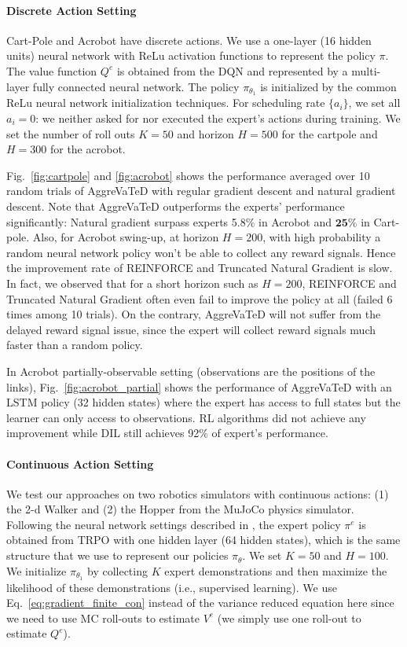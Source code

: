 \documentclass{article}
\begin{document}
\paragraph{Discrete Action Setting} Cart-Pole and Acrobot have discrete actions. We use a one-layer (16 hidden units) neural network with ReLu activation functions to represent the policy $\pi$. The value function $Q^e$ is obtained from the DQN \cite{mnih2015human} and represented by a multi-layer fully connected neural network. The policy $\pi_{\theta_1}$ is initialized by the common ReLu neural network initialization techniques. For scheduling rate $\{a_i\}$, we set all $a_i = 0$: we neither asked for nor executed the expert's actions during training. We set the number of roll outs $K = 50$ and horizon $H = 500$ for the cartpole and $H = 300$ for the acrobot.



Fig.~\ref{fig:cartpole} and \ref{fig:acrobot} shows the performance averaged over 10 random trials of AggreVaTeD with regular gradient descent and natural gradient descent. Note that AggreVaTeD outperforms the experts' performance significantly: Natural gradient surpass experts 5.8$\%$ in Acrobot and $\mathbf{25\%}$ in Cart-pole. Also, for Acrobot swing-up, at horizon $H=200$, with high probability a random neural network policy won't be able to collect any reward signals. Hence the improvement rate of REINFORCE and Truncated Natural Gradient is slow. In fact, we observed that for a short horizon such as $H=200$, REINFORCE and Truncated Natural Gradient often even fail to improve the policy at all (failed 6 times among 10 trials). On the contrary, AggreVaTeD will not suffer from the delayed reward signal issue, since the expert will collect reward signals much faster than a random policy. 

In Acrobot partially-observable setting (observations are the positions of the links), Fig.~\ref{fig:acrobot_partial} shows the performance of AggreVaTeD with an LSTM policy (32 hidden states) where the expert has access to full states but the learner can only access to observations. RL algorithms did not achieve any improvement while DIL still achieves 92$\%$ of expert's performance.

\paragraph{Continuous Action Setting}
We test our approaches on two robotics simulators with continuous actions: (1) the 2-d Walker and (2) the Hopper from the MuJoCo physics simulator. Following the neural network settings described in \citet{schulman2015trust}, the expert policy $\pi^e$ is obtained from TRPO with one hidden layer (64 hidden states), which is the same structure that we use to represent our policies $\pi_{\theta}$. We set $K = 50$ and $H = 100$. We initialize $\pi_{\theta_1}$ by collecting $K$ expert demonstrations and then maximize the likelihood of these demonstrations (i.e., supervised learning). We use Eq.~\ref{eq:gradient_finite_con} instead of the variance reduced equation here since we need to use MC roll-outs to estimate $V^e$ (we simply use one roll-out to estimate $Q^e$). %
\end{document}
